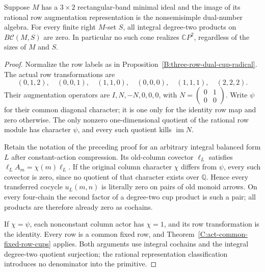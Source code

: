 \begin{corollary}
\label{C:dual-row-all-act-cups}
Suppose $M$ has a $3\times2$ rectangular-band minimal ideal and
the image of its rational row augmentation representation is
the nonsemisimple dual-number algebra.
For every finite right $M$-set $S$, all integral degree-two
products on $B\mathcal C(M,S)$ are zero.
In particular no such cone realizes $\mathbb CP^2$, regardless
of the sizes of $M$ and $S$.
\end{corollary}
\begin{proof}
Normalize the row labels as in
Proposition~\ref{B:three-row-dual-cup-radical}.
The actual row transformations are
\[
 (0,1,2),\quad(0,0,1),\quad(1,1,0),\quad
 (0,0,0),\quad(1,1,1),\quad(2,2,2).
\]
Their augmentation operators are $I,N,-N,0,0,0$, with
$N=\left(\begin{smallmatrix}0&1\\0&0\end{smallmatrix}\right)$.
Write $\psi$ for their common diagonal character; it is one
only for the identity row map and zero otherwise.
The only nonzero one-dimensional quotient of the rational row
module has character $\psi$, and every such quotient kills
$\operatorname{im}N$.

Retain the notation of the preceding proof for an arbitrary
integral balanced form $L$ after constant-action compression.
Its old-column covector $\ell_L$ satisfies
$\ell_LA_m=\chi(m)\ell_L$.
If the original column character $\chi$ differs from $\psi$,
every such covector is zero, since no quotient of that character
exists over $\mathbb Q$.  Hence every transferred cocycle
$u_L(m,n)$ is literally zero on pairs of old monoid arrows.
On every four-chain the second factor of a degree-two cup
product is such a pair; all products are therefore already
zero as cochains.

If $\chi=\psi$, each nonconstant column actor has $\chi=1$,
and its row transformation is the identity.  Every row is a
common fixed row, and
Theorem~\ref{C:act-common-fixed-row-cups} applies.
Both arguments use integral cochains and the integral
degree-two quotient surjection; the rational representation
classification introduces no denominator into the primitive.
\end{proof}

